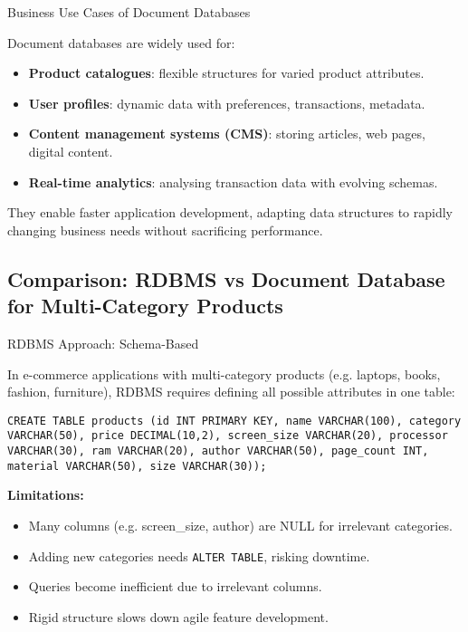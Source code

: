 \documentclass[aspectratio=169, table]{beamer}
\begin{document}
\begin{frame}{Business Use Cases of Document Databases}
	\vspace{20pt}
	
	Document databases are widely used for:
	
	\begin{itemize}
		\item \textbf{Product catalogues}: flexible structures for varied product attributes.
		\item \textbf{User profiles}: dynamic data with preferences, transactions, metadata.
		\item \textbf{Content management systems (CMS)}: storing articles, web pages, digital content.
		\item \textbf{Real-time analytics}: analysing transaction data with evolving schemas.
	\end{itemize}
	
	They enable faster application development, adapting data structures to rapidly changing business needs without sacrificing performance.
	
\end{frame}

\subsection{Comparison: RDBMS vs Document Database for Multi-Category Products}

\begin{frame}[fragile]{RDBMS Approach: Schema-Based}
	\vspace{20pt}
	
	In e-commerce applications with multi-category products (e.g. laptops, books, fashion, furniture), RDBMS requires defining all possible attributes in one table:
	
\begin{lstlisting}[style=SqlStyle]
CREATE TABLE products (id INT PRIMARY KEY, name VARCHAR(100), category VARCHAR(50), price DECIMAL(10,2), screen_size VARCHAR(20), processor VARCHAR(30), ram VARCHAR(20), author VARCHAR(50), page_count INT, material VARCHAR(50), size VARCHAR(30));
\end{lstlisting}

	
	\vspace{5pt}
	\textbf{Limitations:}
	\begin{itemize}
		\item Many columns (e.g. screen\_size, author) are NULL for irrelevant categories.
		\item Adding new categories needs \texttt{ALTER TABLE}, risking downtime.
		\item Queries become inefficient due to irrelevant columns.
		\item Rigid structure slows down agile feature development.
	\end{itemize}
	
\end{frame}
\end{document}
